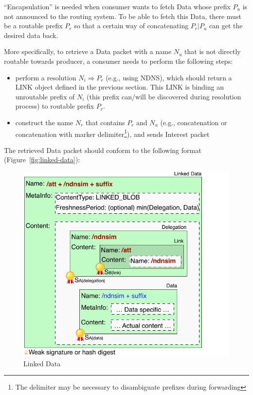 \documentclass[10pt]{article}
\begin{document}
``Encapsulation'' is needed when consumer wants to fetch Data whose prefix $P_u$ is not announced to the routing system.
To be able to fetch this Data, there must be a routable prefix $P_r$ so that a certain way of concatenating $P_r|P_u$ can get the desired data back.

More specifically, to retrieve a Data packet with a name $N_{u}$ that is not directly routable towards producer, a consumer needs to perform the following steps:

\begin{itemize}
\item perform a resolution $N_i \Rightarrow P_r$ (e.g., using NDNS), which should return a LINK object defined in the previous section.
  This LINK is binding an unroutable prefix of $N_i$ (this prefix can/will be discovered during resolution process) to routable prefix $P_r$.
\item construct the name $N_{r}$ that contains $P_r$ and $N_{u}$ (e.g., concatenation or concatenation with marker delimiter\footnote{The delimiter may be necessary to disambiguate prefixes during forwarding}), and sends Interest packet
\end{itemize}

The retrieved Data packet should conform to the following format (Figure~\ref{fig:linked-data}):

\begin{figure}[h]
  \centering
  \includegraphics[scale=0.8]{linked-data}
  \caption{Linked Data}
  \label{fig:linked-dat}
\end{figure}
\end{document}

